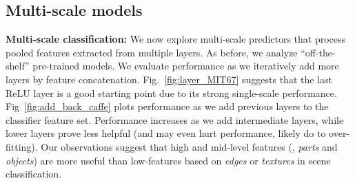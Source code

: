 \documentclass[10pt,twocolumn,letterpaper]{article}
\begin{document}
\subsection{Multi-scale models} 

{\bf Multi-scale classification:} We now explore multi-scale predictors that process pooled features extracted from multiple layers. As before, we analyze ``off-the-shelf'' pre-trained models. We evaluate performance as we iteratively add more layers by feature concatenation. Fig.~\ref{fig:layer_MIT67} suggests that the last ReLU layer is a good starting point due to its strong single-scale performance. Fig~\ref{fig:add_back_caffe} plots performance as we add previous layers to the classifier feature set. Performance increases as we add intermediate layers, while lower layers prove less helpful (and may even hurt performance, likely do to over-fitting). Our observations suggest that high and mid-level features (\ie, \textit{parts} and \textit{objects}) are more useful than low-features based on \textit{edges} or \textit{textures} in scene classification. 




\end{document}
